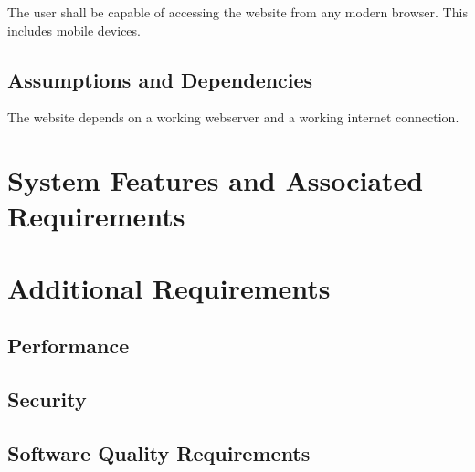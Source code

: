 \documentclass{article}
\begin{document}
The user shall be capable of accessing the website from any modern
browser. This includes mobile devices.

\subsection{Assumptions and Dependencies}

The website depends on a working webserver and a working internet
connection.

\section{System Features and Associated Requirements}


\section{Additional Requirements}

\subsection{Performance}

\subsection{Security}

\subsection{Software Quality Requirements}
\end{document}
